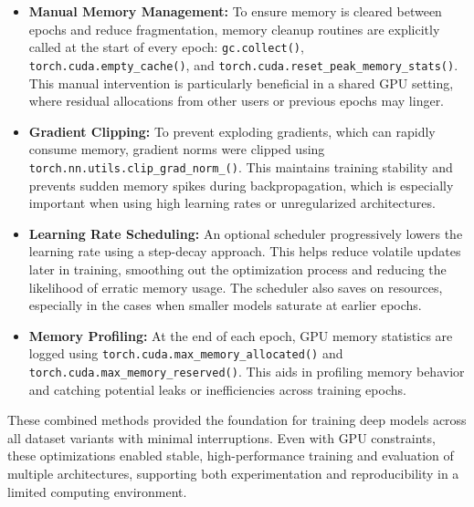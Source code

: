 \begin{itemize}
    \item \textbf{Manual Memory Management:} To ensure memory is cleared between epochs and reduce fragmentation, memory cleanup routines are explicitly called at the start of every epoch: \texttt{gc.collect()}, \texttt{torch.cuda.empty\_cache()}, and \texttt{torch.cuda.reset\_peak\_memory\_stats()}. This manual intervention is particularly beneficial in a shared GPU setting, where residual allocations from other users or previous epochs may linger.

    \item \textbf{Gradient Clipping:} To prevent exploding gradients, which can rapidly consume memory, gradient norms were clipped using \texttt{torch.nn.utils.clip\_grad\_norm\_()}. This maintains training stability and prevents sudden memory spikes during backpropagation, which is especially important when using high learning rates or unregularized architectures.

    \item \textbf{Learning Rate Scheduling:} An optional scheduler progressively lowers the learning rate using a step-decay approach. This helps reduce volatile updates later in training, smoothing out the optimization process and reducing the likelihood of erratic memory usage. The scheduler also saves on resources, especially in the cases when smaller models saturate at earlier epochs.

    \item \textbf{Memory Profiling:} At the end of each epoch, GPU memory statistics are logged using \texttt{torch.cuda.max\_memory\_allocated()} and \texttt{torch.cuda.max\_memory\_reserved()}. This aids in profiling memory behavior and catching potential leaks or inefficiencies across training epochs. 
\end{itemize}

These combined methods provided the foundation for training deep models across all dataset variants with minimal interruptions. Even with GPU constraints, these optimizations enabled stable, high-performance training and evaluation of multiple architectures, supporting both experimentation and reproducibility in a limited computing environment.
